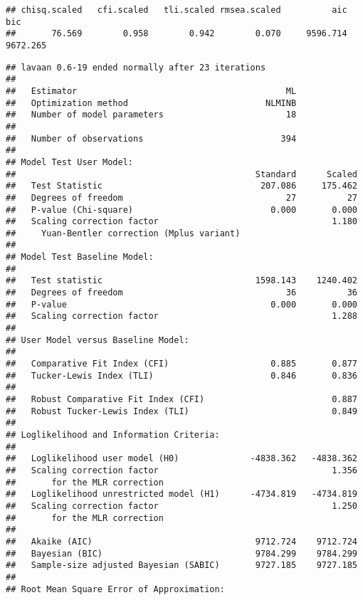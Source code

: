 \documentclass[
  doc,draftall]{apa6}
\begin{document}
\begin{verbatim}
## chisq.scaled   cfi.scaled   tli.scaled rmsea.scaled          aic          bic 
##       76.569        0.958        0.942        0.070     9596.714     9672.265
\end{verbatim}

\begin{verbatim}
## lavaan 0.6-19 ended normally after 23 iterations
## 
##   Estimator                                         ML
##   Optimization method                           NLMINB
##   Number of model parameters                        18
## 
##   Number of observations                           394
## 
## Model Test User Model:
##                                               Standard      Scaled
##   Test Statistic                               207.086     175.462
##   Degrees of freedom                                27          27
##   P-value (Chi-square)                           0.000       0.000
##   Scaling correction factor                                  1.180
##     Yuan-Bentler correction (Mplus variant)                       
## 
## Model Test Baseline Model:
## 
##   Test statistic                              1598.143    1240.402
##   Degrees of freedom                                36          36
##   P-value                                        0.000       0.000
##   Scaling correction factor                                  1.288
## 
## User Model versus Baseline Model:
## 
##   Comparative Fit Index (CFI)                    0.885       0.877
##   Tucker-Lewis Index (TLI)                       0.846       0.836
##                                                                   
##   Robust Comparative Fit Index (CFI)                         0.887
##   Robust Tucker-Lewis Index (TLI)                            0.849
## 
## Loglikelihood and Information Criteria:
## 
##   Loglikelihood user model (H0)              -4838.362   -4838.362
##   Scaling correction factor                                  1.356
##       for the MLR correction                                      
##   Loglikelihood unrestricted model (H1)      -4734.819   -4734.819
##   Scaling correction factor                                  1.250
##       for the MLR correction                                      
##                                                                   
##   Akaike (AIC)                                9712.724    9712.724
##   Bayesian (BIC)                              9784.299    9784.299
##   Sample-size adjusted Bayesian (SABIC)       9727.185    9727.185
## 
## Root Mean Square Error of Approximation:

\end{verbatim}
\end{document}
